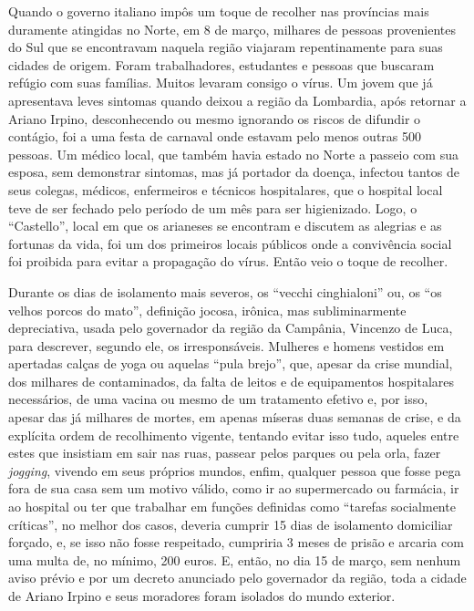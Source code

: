 Quando o governo italiano impôs um toque de recolher nas províncias mais
duramente atingidas no Norte, em 8 de março, milhares de pessoas
provenientes do Sul que se encontravam naquela região viajaram
repentinamente para suas cidades de origem. Foram trabalhadores,
estudantes e pessoas que buscaram refúgio com suas famílias. Muitos
levaram consigo o vírus. Um jovem que já apresentava leves sintomas
quando deixou a região da Lombardia, após retornar a Ariano Irpino,
desconhecendo ou mesmo ignorando os riscos de difundir o contágio, foi a
uma festa de carnaval onde estavam pelo menos outras 500 pessoas. Um
médico local, que também havia estado no Norte a passeio com sua esposa,
sem demonstrar sintomas, mas já portador da doença, infectou tantos de
seus colegas, médicos, enfermeiros e técnicos hospitalares, que o
hospital local teve de ser fechado pelo período de um mês para ser
higienizado. Logo, o ``Castello'', local em que os arianeses se
encontram e discutem as alegrias e as fortunas da vida, foi um dos
primeiros locais públicos onde a convivência social foi proibida para
evitar a propagação do vírus. Então veio o toque de recolher.

Durante os dias de isolamento mais severos, os ``vecchi cinghialoni''
ou, os ``os velhos porcos do mato'', definição jocosa, irônica, mas
subliminarmente depreciativa, usada pelo governador da região da
Campânia, Vincenzo de Luca, para descrever, segundo ele, os
irresponsáveis. Mulheres e homens vestidos em apertadas calças de yoga
ou aquelas ``pula brejo'', que, apesar da crise mundial, dos milhares de
contaminados, da falta de leitos e de equipamentos hospitalares
necessários, de uma vacina ou mesmo de um tratamento efetivo e, por
isso, apesar das já milhares de mortes, em apenas míseras duas semanas
de crise, e da explícita ordem de recolhimento vigente, tentando evitar
isso tudo, aqueles entre estes que insistiam em sair nas ruas, passear
pelos parques ou pela orla, fazer \emph{jogging}, vivendo em seus
próprios mundos, enfim, qualquer pessoa que fosse pega fora de sua casa
sem um motivo válido, como ir ao supermercado ou farmácia, ir ao
hospital ou ter que trabalhar em funções definidas como ``tarefas
socialmente críticas'', no melhor dos casos, deveria cumprir 15 dias de
isolamento domiciliar forçado, e, se isso não fosse respeitado,
cumpriria 3 meses de prisão e arcaria com uma multa de, no mínimo, 200
euros. E, então, no dia 15 de março, sem nenhum aviso prévio e por um
decreto anunciado pelo governador da região, toda a cidade de Ariano
Irpino e seus moradores foram isolados do mundo exterior.

